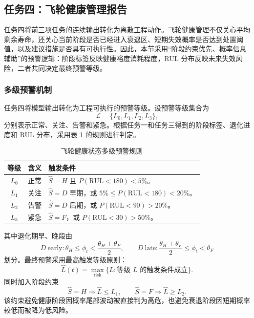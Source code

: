 \subsection{任务四：飞轮健康管理报告}

任务四将前三项任务的连续输出转化为离散工程动作。飞轮健康管理不仅关心平均剩余寿命，还关心当前阶段是否已经进入衰退区、短期失效概率是否达到处置阈值，以及建议措施是否具有可执行性。因此，本节采用“阶段约束优先、概率信息辅助”的预警逻辑：阶段标签反映健康裕度消耗程度，RUL 分布反映未来失效风险，二者共同决定最终预警等级。

\subsubsection{多级预警机制}

任务四将模型输出转化为工程可执行的预警等级。设预警等级集合为
\begin{equation}
  \mathcal L=\{L_0,L_1,L_2,L_3\},
\end{equation}
分别表示正常、关注、告警和紧急。根据任务一和任务三得到的阶段标签、退化进度和 RUL 分布，采用表 \ref{tab:warning_rules} 的规则进行判定。

\begin{table}[htbp]
  \centering
  \caption{飞轮健康状态多级预警规则}
  \label{tab:warning_rules}
  \begin{tabularx}{\textwidth}{c c X}
    \toprule
    等级 & 含义 & 触发条件 \\
    \midrule
    $L_0$ & 正常 & $\hat S=H$ 且 $P(\mathrm{RUL}<180)<5\%$。 \\
    $L_1$ & 关注 & $\hat S=D$ 早期，或 $5\%\le P(\mathrm{RUL}<180)<20\%$。 \\
    $L_2$ & 告警 & $\hat S=D$ 后期，或 $P(\mathrm{RUL}<90)>20\%$。 \\
    $L_3$ & 紧急 & $\hat S=F$，或 $P(\mathrm{RUL}<30)>50\%$。 \\
    \bottomrule
  \end{tabularx}
\end{table}

其中退化期早、晚段由
\begin{equation}
  \label{eq:q4_d_split}
  D\ \mathrm{early}:
  \theta_H\le\phi_t<\frac{\theta_H+\theta_F}{2},
  \qquad
  D\ \mathrm{late}:
  \frac{\theta_H+\theta_F}{2}\le\phi_t<\theta_F
\end{equation}
划分。最终预警采用最高触发等级原则：
\begin{equation}
  \label{eq:q4_warning_max}
  \hat L(t)=\max_{\mathrm{risk}}\{L:\text{等级 }L\text{ 的触发条件成立}\}.
\end{equation}
同时加入阶段约束
\begin{equation}
  \label{eq:q4_order}
  \hat S=H\Rightarrow \hat L\le L_1,
  \qquad
  \hat S=F\Rightarrow \hat L\ge L_2.
\end{equation}
该约束避免健康阶段因概率尾部波动被直接判为高危，也避免衰退阶段因短期概率较低而被降为低风险。

